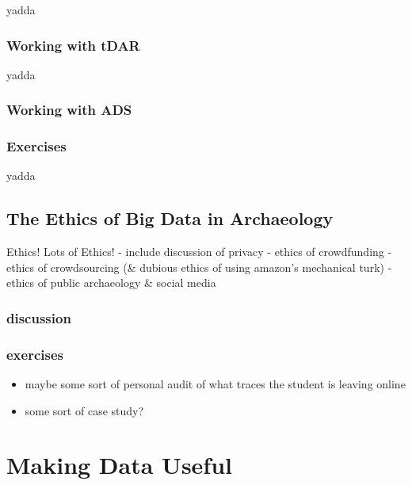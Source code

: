 \documentclass[english,]{book}
\providecommand{\tightlist}{%
  \setlength{\itemsep}{0pt}\setlength{\parskip}{0pt}}
\begin{document}
yadda

\subsection{Working with tDAR}\label{working-with-tdar}

yadda

\subsection{Working with ADS}\label{working-with-ads}

\subsection{Exercises}\label{exercises-5}

yadda

\hypertarget{the-ethics-of-big-data-in-archaeology}{\section{The Ethics
of Big Data in
Archaeology}\label{the-ethics-of-big-data-in-archaeology}}

Ethics! Lots of Ethics! - include discussion of privacy - ethics of
crowdfunding - ethics of crowdsourcing (\& dubious ethics of using
amazon's mechanical turk) - ethics of public archaeology \& social media

\subsection{discussion}\label{discussion-1}

\subsection{exercises}\label{exercises-6}

\begin{itemize}
\tightlist
\item
  maybe some sort of personal audit of what traces the student is
  leaving online
\item
  some sort of case study?
\end{itemize}

\chapter{Making Data Useful}\label{making-data-useful}
\end{document}
